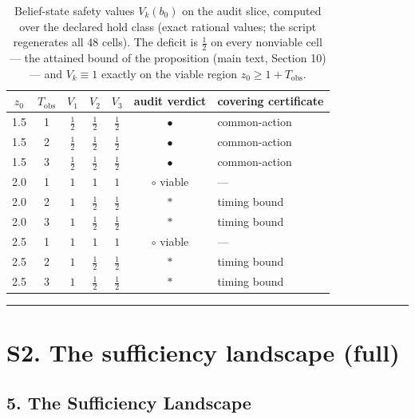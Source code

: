 \documentclass[11pt]{article}
\theoremstyle{definition}
\begin{document}
\begin{table}[t]
\centering
\footnotesize
\begin{tabular}{@{}ccccccl@{}}
\toprule
\(z_{0}\) & \(T_{\mathrm{obs}}\) & \(V_{1}\) & \(V_{2}\) & \(V_{3}\) & audit verdict & covering certificate \\
\midrule
1.5 & 1 & \(\tfrac{1}{2}\) & \(\tfrac{1}{2}\) & \(\tfrac{1}{2}\) & \(\bullet\) & common-action \\
1.5 & 2 & \(\tfrac{1}{2}\) & \(\tfrac{1}{2}\) & \(\tfrac{1}{2}\) & \(\bullet\) & common-action \\
1.5 & 3 & \(\tfrac{1}{2}\) & \(\tfrac{1}{2}\) & \(\tfrac{1}{2}\) & \(\bullet\) & common-action \\
2.0 & 1 & \(1\) & \(1\) & \(1\) & \(\circ\) viable & --- \\
2.0 & 2 & \(1\) & \(\tfrac{1}{2}\) & \(\tfrac{1}{2}\) & \(\ast\) & timing bound \\
2.0 & 3 & \(1\) & \(\tfrac{1}{2}\) & \(\tfrac{1}{2}\) & \(\ast\) & timing bound \\
2.5 & 1 & \(1\) & \(1\) & \(1\) & \(\circ\) viable & --- \\
2.5 & 2 & \(1\) & \(\tfrac{1}{2}\) & \(\tfrac{1}{2}\) & \(\ast\) & timing bound \\
2.5 & 3 & \(1\) & \(\tfrac{1}{2}\) & \(\tfrac{1}{2}\) & \(\ast\) & timing bound \\
\bottomrule
\end{tabular}
\caption{Belief-state safety values \(V_{k}(b_{0})\) on the audit slice,
computed over the declared hold class (exact rational values; the script
regenerates all 48 cells). The deficit is \(\tfrac{1}{2}\) on every nonviable
cell --- the attained bound of the proposition (main text, Section 10) --- and
\(V_{k} \equiv 1\) exactly on the viable region \(z_{0} \ge 1 + T_{\mathrm{obs}}\).}
\label{tab:beliefV}
\end{table}
\rule{0.5\linewidth}{0.5pt}

\bigskip

\section*{S2. The sufficiency landscape (full)}

\subsection{5. The Sufficiency Landscape}\label{the-sufficiency-landscape-cited}
\end{document}
